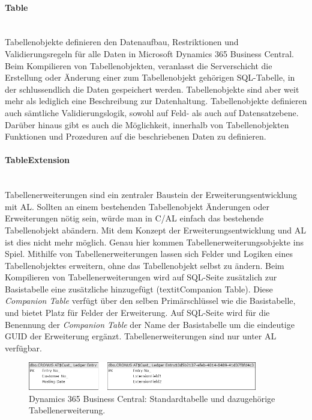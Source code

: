 \paragraph{Table}\mbox{}\\
Tabellenobjekte definieren den Datenaufbau, Restriktionen und Validierungsregeln für alle Daten in Microsoft Dynamics 365 Business Central. Beim Kompilieren von Tabellenobjekten, veranlasst die Serverschicht die Erstellung oder Änderung einer zum Tabellenobjekt gehörigen SQL-Tabelle, in der schlussendlich die Daten gespeichert werden. Tabellenobjekte sind aber weit mehr als lediglich eine Beschreibung zur Datenhaltung. Tabellenobjekte definieren auch sämtliche Validierungslogik, sowohl auf Feld- als auch auf Datensatzebene. Darüber hinaus gibt es auch die Möglichkeit, innerhalb von Tabellenobjekten Funktionen und Prozeduren auf die beschriebenen Daten zu definieren.
\linebreak

\paragraph{TableExtension}\mbox{}\\
Tabellenerweiterungen sind ein zentraler Baustein der Erweiterungsentwicklung mit AL. Sollten an einem bestehenden Tabellenobjekt Änderungen oder Erweiterungen nötig sein, würde man in C/AL einfach das bestehende Tabellenobjekt abändern. Mit dem Konzept der Erweiterungsentwicklung und AL ist dies nicht mehr möglich. Genau hier kommen Tabellenerweiterungsobjekte ins Spiel. Mithilfe von Tabellenerweiterungen lassen sich Felder und Logiken eines Tabellenobjektes erweitern, ohne das Tabellenobjekt selbst zu ändern. Beim Kompilieren von Tabellenerweiterungen wird auf SQL-Seite zusätzlich zur Basistabelle eine zusätzliche hinzugefügt (textit{Companion Table}). Diese \textit{Companion Table} verfügt über den selben Primärschlüssel wie die Basistabelle, und bietet Platz für Felder der Erweiterung. Auf SQL-Seite wird für die Benennung der \textit{Companion Table} der Name der Basistabelle um die eindeutige GUID der Erweiterung ergänzt. Tabellenerweiterungen sind nur unter AL verfügbar.
\begin{figure}[h]
	\centering
	\includegraphics[width=100mm]{images/TableExtenison}
	\caption{Dynamics 365 Business Central: Standardtabelle und dazugehörige Tabellenerweiterung.}
	\label{fig:TableExtension}
\end{figure}

